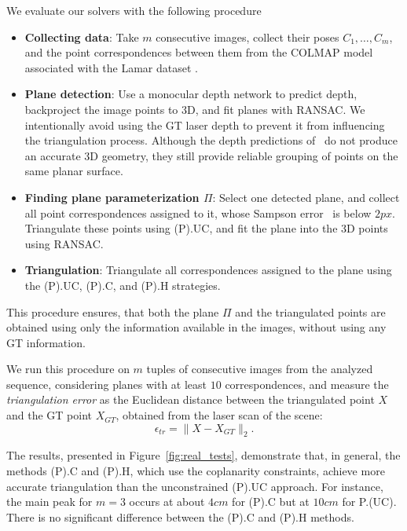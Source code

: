 \documentclass{article}
\begin{document}
We evaluate our solvers with the following procedure
\begin{itemize}
    \item \textbf{Collecting data}: Take $m$ consecutive images, collect their poses $C_{1},\ldots,C_{m}$, and the point correspondences between them from the COLMAP model associated with the Lamar dataset \cite{sarlin2022lamar}.
    \item \textbf{Plane detection}: Use a monocular depth network \cite{depth_anything_v2} to predict depth, backproject the image points to 3D, and fit planes with RANSAC. We intentionally avoid using the GT laser depth to prevent it from influencing the triangulation process. Although the depth predictions of~\cite{depth_anything_v2} do not produce an accurate 3D geometry, they still provide reliable grouping of points on the same planar surface.
    \item \textbf{Finding plane parameterization $\Pi$}: Select one detected plane, and collect all point correspondences assigned to it, whose Sampson error~\cite{DBLP:books/cu/HZ2004} is below $2px$. Triangulate these points using (P).UC, and fit the plane into the 3D points using RANSAC.
    \item \textbf{Triangulation}: Triangulate all correspondences assigned to the plane using the (P).UC, (P).C, and (P).H strategies.
\end{itemize}
This procedure ensures, that both the plane $\Pi$ and the triangulated points are obtained using only the information available in the images, without using any GT information.

We run this procedure on $m$ tuples of consecutive images from the analyzed sequence, considering planes with at least $10$ correspondences, and measure the \textit{triangulation error} as the Euclidean distance between the triangulated point $X$ and the GT point $X_{GT}$, obtained from the laser scan of the scene:
\begin{equation}
    \epsilon_{tr} = \lVert X - X_{GT} \rVert_2.
\end{equation}

The results, presented in Figure~\ref{fig:real_tests}, demonstrate that, in general, the methods (P).C and (P).H, which use the coplanarity constraints, achieve more accurate triangulation than the unconstrained (P).UC approach. For instance, the main peak for $m=3$ occurs at about $4cm$ for (P).C but at $10cm$ for P.(UC). There is no significant difference between the (P).C and (P).H methods.
\end{document}
